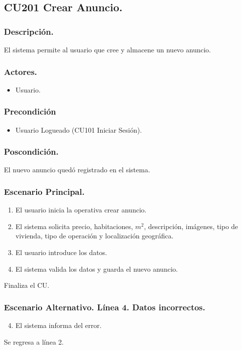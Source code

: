 \subsection{CU201 Crear Anuncio.}
\subsubsection{Descripci\'{o}n.}
El sistema permite al usuario que cree y almacene un nuevo anuncio.
\subsubsection{Actores.}
\begin{itemize}
\item Usuario.
\end{itemize}
\subsubsection{Precondici\'{o}n}
\begin{itemize}
\item Usuario Logueado (CU101 Iniciar Sesi\'{o}n).
\end{itemize}
\subsubsection{Poscondici\'{o}n.}
El nuevo anuncio qued\'{o} registrado en el sistema.
\subsubsection{Escenario Principal.}
\begin{enumerate}
\item El usuario inicia la operativa crear anuncio.
\item El sistema solicita precio, habitaciones, $m^{2}$, descripci\'{o}n, im\'{a}genes, tipo de vivienda, tipo de operaci\'{o}n y localizaci\'{o}n geogr\'{a}fica.
\item El usuario introduce los datos.
\item El sistema valida los datos y guarda el nuevo anuncio.
\end{enumerate}
Finaliza el CU.
\subsubsection{Escenario Alternativo. L\'{i}nea 4. Datos incorrectos.}
\begin{enumerate}
\setcounter{enumi}{3}
\item El sistema informa del error.
\end{enumerate}
Se regresa a l\'{i}nea 2.
